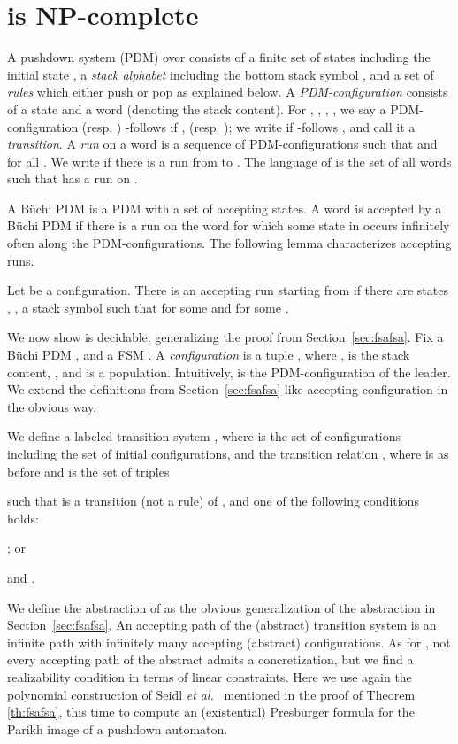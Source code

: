 \documentclass{llncs}
\begin{document}
\makeatletter{}


\section{ is NP-complete}
\label{sec:pdafsa}

A pushdown system (PDM)  over  consists of a finite set  of states 
including the initial state ,
a \emph{stack alphabet}  including the bottom stack symbol , and a set of \emph{rules}
 which either push or pop as explained below.
A \emph{PDM-configuration}  consists of a state  and a word
 (denoting the stack content).  For , , , , we say a
PDM-configuration  (resp. ) -follows  if ,
(resp. ); we write  if  -follows , and call it a {\em transition}.
A \emph{run}  on a word 
is a sequence of PDM-configurations such that  and 
 for all .
We write  if there is a run from  to . 
The language  of  is the set of all words 
such that  has a run on .

A B\"uchi PDM is a PDM with a set  of accepting states.
A word is accepted by a B\"uchi PDM if there is a run on the word for which some state in  occurs infinitely often along the
PDM-configurations. The following lemma characterizes accepting runs.

\begin{lemma}{\cite{BEM97}}
\label{lem:pdacycle}
Let  be a configuration.
There is an accepting run starting from  if there are states , ,
a stack symbol  such that
 for some 
and  for some .
\end{lemma}

We now show  is decidable, generalizing the proof from Section~\ref{sec:fsafsa}.
Fix a B\"uchi PDM , and a FSM . 
A {\em configuration} is a tuple , where ,
 is the stack content, , and  is a population.
Intuitively,  is the PDM-configuration of the leader.
We extend the definitions from Section~\ref{sec:fsafsa} like accepting configuration in the obvious way.

We define a labeled transition system , where  is the set of configurations including the set  of initial configurations,
and the transition relation , where  is as before and  is the set of triples
 
  such that  is a transition (not a rule) of , and one of the following conditions holds:
  \begin{inparaenum}[(i)]
  \item ; or
  \item  and .
  \end{inparaenum}
We define the abstraction  of  as the obvious generalization of the abstraction in Section~\ref{sec:fsafsa}.
An accepting path of the (abstract) transition system is an infinite path  with infinitely many accepting (abstract) configurations. As for , not every accepting path of the abstract admits a concretization, but we find a realizability condition in terms of linear constraints. Here we use again the polynomial construction of 
Seidl \textit{et al.}~\cite{Seidl05} mentioned in the proof of 
Theorem \ref{th:fsafsa}, this time to compute an (existential) Presburger formula
for the Parikh image of a pushdown automaton. 
\end{document}
